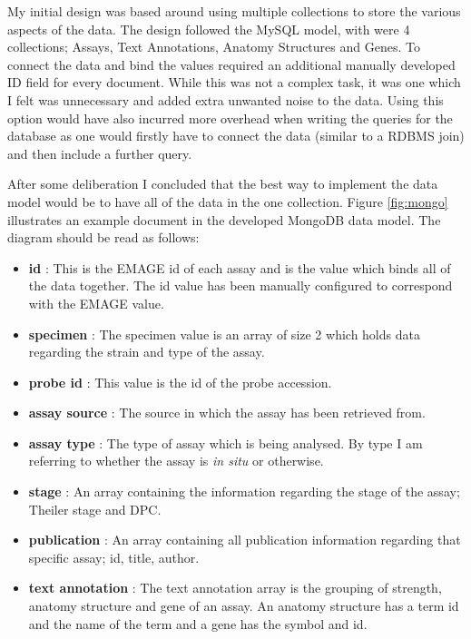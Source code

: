 My initial design was based around using multiple collections to store the various aspects of the data. The design followed the MySQL model, with were 4 collections; Assays, Text Annotations, Anatomy Structures and Genes. To connect the data and bind the values required an additional manually developed ID field for every document. While this was not a complex task, it was one which I felt was unnecessary and added extra unwanted noise to the data. Using this option would have also incurred more overhead when writing the queries for the database as one would firstly have to connect the data (similar to a RDBMS join) and then include a further query.

After some deliberation I concluded that the best way to implement the data model would be to have all of the data in the one collection. Figure \ref{fig:mongo} illustrates an example document in the developed MongoDB data model. The diagram should be read as follows:

\begin{itemize}
\item \textbf{id} : This is the EMAGE id of each assay and is the value which binds all of the data together. The id value has been manually configured to correspond with the EMAGE value.
\item \textbf{specimen} : The specimen value is an array of size 2 which holds data regarding the strain and type of the assay.
\item \textbf{probe id} : This value is the id of the probe accession.
\item \textbf{assay source} : The source in which the assay has been retrieved from.
\item \textbf{assay type} : The type of assay which is being analysed. By type I am referring to whether the assay is \textit{in situ} or otherwise.
\item \textbf{stage} : An array containing the information regarding the stage of the assay; Theiler stage and DPC.
\item \textbf{publication} : An array containing all publication information regarding that specific assay; id, title, author.
\item \textbf{text annotation} : The text annotation array is the grouping of strength, anatomy structure and gene of an assay. An anatomy structure has a term id and the name of the term and a gene has the symbol and id.
\end{itemize}


